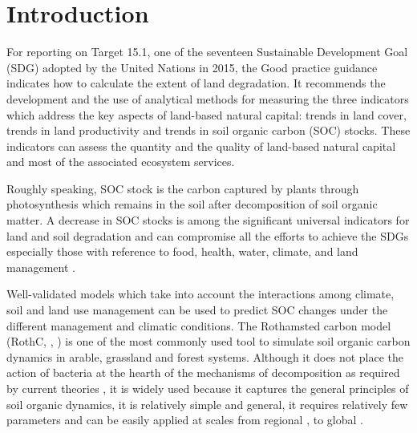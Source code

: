 \section{Introduction}
\label{intro}
For reporting on Target 15.1, one of the seventeen Sustainable Development Goal (SDG) adopted by the United Nations \cite{minelli2017scientific} in 2015, the Good practice guidance \cite{good} indicates how to  calculate the extent of land degradation. It recommends the development and the use  of  analytical methods for measuring the three indicators which address the key aspects of land-based natural capital: trends in land cover, trends in land productivity and trends in  soil organic carbon (SOC) stocks. These indicators can assess the quantity and the quality of land-based natural capital and most of the associated ecosystem services.

\noindent Roughly speaking, SOC stock is the carbon captured by plants through photosynthesis which remains in the soil after decomposition of soil organic matter.  A decrease in SOC stocks is among the significant universal indicators for land and soil degradation  and can compromise all the efforts to achieve the SDGs especially those with reference to food, health, water, climate, and land management \cite{lorenz2019soil}. 

\noindent  Well-validated models which take into account the  interactions among climate, soil and land use management can be used to predict SOC changes under the different management and climatic conditions. The Rothamsted carbon model (RothC, \cite{coleman1996rothc}, \cite{parshotam1996rothamsted}) is one of the most commonly used tool to simulate soil organic carbon dynamics in arable, grassland and forest systems. Although it does not place the action of bacteria at the hearth of the  mechanisms of decomposition   as required by current theories \cite{lehmann2015contentious,hammoudi2015mathematical}, it is widely used because it captures the general principles of soil organic dynamics,  it is relatively simple and general, it requires relatively few parameters and can be  easily applied at scales  from  regional \cite{farina2013modification}, to global  \cite{morais2019detailed}.



